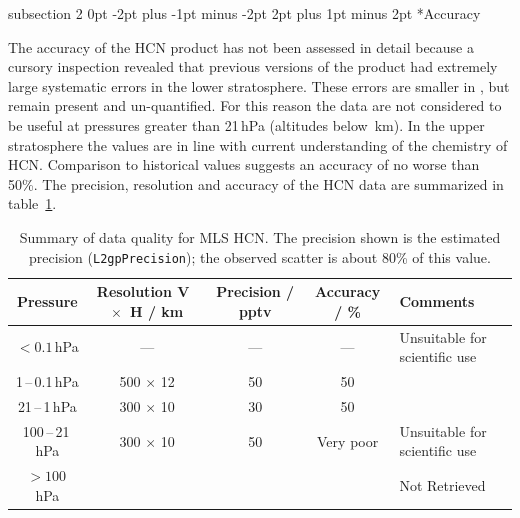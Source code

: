 \documentclass[11pt,draft]{report}
\makeatletter
\newlength{\tablecaptionsep}
\renewcommand{\subsection}{\@startsection%
  {subsection}%
  {2}%
  {0pt}%
  {-2pt plus -1pt minus -2pt}%
  {2pt plus 1pt minus 2pt}%
  {\large\sffamily\fontseries{sb}\selectfont\flushleft\color{SectionColor}\figureversion{tabular}}}%
\makeatother
\begin{document}
\subsection*{Accuracy}

The accuracy of the HCN product has not been assessed in detail
because a cursory inspection revealed that previous versions of the
product had extremely large systematic errors in the lower
stratosphere. These errors are smaller in \thisv, but remain present and
un-quantified.  For this reason the data are not considered to be useful
at pressures greater than 21\,hPa (altitudes
below \,km).  In the upper stratosphere the values are
in line with current understanding of the chemistry of HCN\@.
Comparison to historical values suggests an accuracy of no worse than
50\%. The precision, resolution and accuracy of the HCN data are
summarized in table~\ref{tab:HCNSummary}.

\begin{table}
  \caption{Summary of data quality for MLS \thisv HCN\@. The precision shown
    is the estimated precision (\texttt{L2gpPrecision}); the observed
    scatter is about 80\% of this value.}
  \vspace{\tablecaptionsep}
\label{tab:HCNSummary}
\centering\begin{tabular}{ccccm{25ex}}
  \toprule
  \parbox{10ex}{\bfseries\centering Pressure} &
  \parbox{11ex}{\bfseries\centering Resolution \mbox{V $\times$ H} / km} &
  \parbox{10ex}{\bfseries\centering Precision / pptv} &
  \parbox{10ex}{\bfseries\centering Accuracy / \%} &
  \parbox{12ex}{\bfseries\centering Comments}\\
  \midrule
  $< 0.1$\,hPa & ---    &  ---      &  ---     & Unsuitable for scientific use\\
  1\,--\,0.1\,hPa & 500 $\times$ 12   & 50 & 50 & \\
  21\,--\,1\,hPa & 300 $\times$ 10   & 30 & 50 & \\
  100\,--\,21\,hPa  & 300 $\times$ 10 & 50 & Very poor & Unsuitable for scientific use\\
  $> 100$\,hPa &                 &   &    &  Not Retrieved\\
  \bottomrule
\end{tabular}
\end{table}
\end{document}
